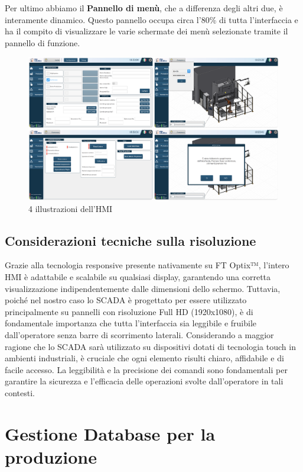 Per ultimo abbiamo il \textbf{Pannello di menù}, che a differenza degli altri due, è interamente dinamico. Questo pannello occupa circa l'80\% di tutta l'interfaccia e ha il compito di visualizzare le varie schermate dei menù selezionate tramite il pannello di funzione. 

\begin{figure} [ht]
    \centering
    \includegraphics[width=1\linewidth]{Immagini/HMI01.png}
    \caption{4 illustrazioni dell'HMI}
    \label{fig:HMI01.png}
\end{figure}

\subsection{Considerazioni tecniche sulla risoluzione}
Grazie alla tecnologia responsive presente nativamente su FT Optix™, l'intero HMI è adattabile e scalabile su qualsiasi display, garantendo una corretta visualizzazione indipendentemente dalle dimensioni dello schermo. Tuttavia, poiché nel nostro caso lo SCADA è progettato per essere utilizzato principalmente su pannelli con risoluzione Full HD (1920x1080), è di fondamentale importanza che tutta l'interfaccia sia leggibile e fruibile dall'operatore senza barre di scorrimento laterali.
Considerando a maggior ragione che lo SCADA sarà utilizzato su dispositivi dotati di tecnologia touch in ambienti industriali, è cruciale che ogni elemento risulti chiaro, affidabile e di facile accesso. La leggibilità e la precisione dei comandi sono fondamentali per garantire la sicurezza e l'efficacia delle operazioni svolte dall'operatore in tali contesti.

\section{Gestione Database per la produzione}

